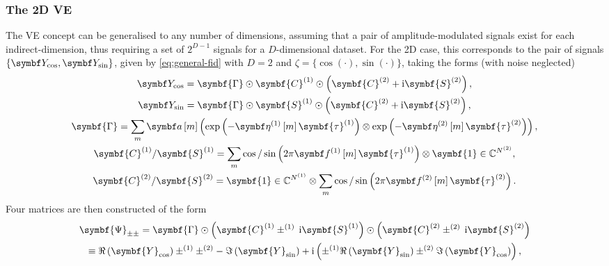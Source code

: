 \subsubsection{The \acs{2D} \acl{VE}}
The \ac{VE} concept can be generalised to any number of dimensions, assuming
that a pair of amplitude-modulated signals exist for each indirect-dimension,
thus requiring a set of $2^{D-1}$ signals for a $D$-dimensional dataset.
For the
\ac{2D} case, this corresponds to the pair of signals $\lbrace \bY_{\cos},
\bY_{\sin} \rbrace$, given by \eqref{eq:general-fid} with $D=2$ and $\zeta = \lbrace
\cos(\cdot), \sin(\cdot) \rbrace$, taking the forms (with noise neglected)
\begin{subequations}
    \begin{gather}
        \bY_{\cos} =
            \symbf{\Gamma} \odot
            \symbf{C}^{(1)} \odot \left(
                \symbf{C}^{(2)} +
                \iu \symbf{S}^{(2)}
            \right), \\
        \bY_{\sin} =
            \symbf{\Gamma} \odot
            \symbf{S}^{(1)} \odot \left(
                \symbf{C}^{(2)} +
                \iu \symbf{S}^{(2)}
            \right), \\
        \symbf{\Gamma} =
            \sum_m \bdam \left(
                \exp \left( -\bdetaonem \symbf{\tau}^{(1)} \right) \otimes
                \exp \left( -\bdetatwom \symbf{\tau}^{(2)} \right)
            \right), \\
        \symbf{C}^{(1)} \text{/} \symbf{S}^{(1)}
        = \sum_{m} \cos \text{/} \sin \left(2 \pi \bdfonem \symbf{\tau}^{(1)} \right)
            \otimes \symbf{1} \in \mathbb{C}^{\Ntwo}, \\
        \symbf{C}^{(2)} \text{/} \symbf{S}^{(2)} =
            \symbf{1} \in \mathbb{C}^{\None} \otimes
            \sum_{m} \cos \text{/} \sin \left(2 \pi \bdftwom \symbf{\tau}^{(2)} \right).
    \end{gather}
\end{subequations}
Four matrices are then constructed of the form
\begin{equation}
    \begin{gathered}
        \symbf{\Psi}_{\pm\pm} =
            \symbf{\Gamma} \odot \left(
                \symbf{C}^{(1)} \pm^{(1)} \hspace*{2pt} \iu \symbf{S}^{(1)}
                \right) \odot \left(
                    \symbf{C}^{(2)} \pm^{(2)} \hspace*{2pt} \iu \symbf{S}^{(2)}
                \right) \\
         \equiv
             \Re\left( \symbf{Y}_{\cos} \right)
             \pm^{(1)} \pm^{(2)} -
             \Im\left( \symbf{Y}_{\sin} \right)
             + \iu \left(
             \pm^{(1)}
             \Re\left( \symbf{Y}_{\sin} \right)
             \pm^{(2)}
             \Im\left( \symbf{Y}_{\cos} \right)
             \right),
    \end{gathered}
\end{equation}
